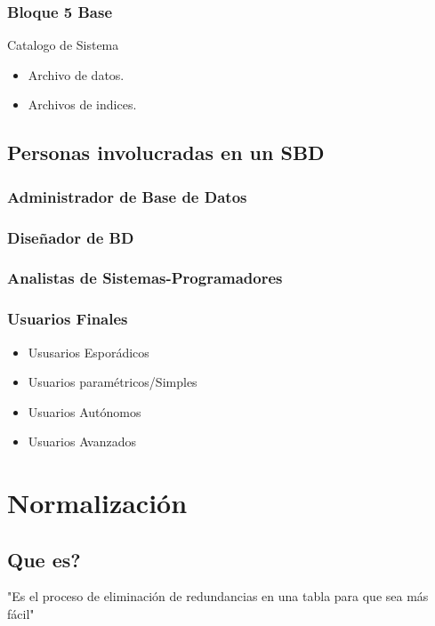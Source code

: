 \documentclass[12pt, fleqn]{report}                             %
\theoremstyle{break}                                            %
\begin{document}
		\subsubsection{Bloque 5 Base}

		Catalogo de Sistema
		\begin{itemize}
			\item Archivo de datos.
			\item Archivos de indices.
		\end{itemize}



	\subsection{Personas involucradas en un SBD}

		\subsubsection{Administrador de Base de Datos}
		\subsubsection{Diseñador de BD}
		\subsubsection{Analistas de Sistemas-Programadores}
		\subsubsection{Usuarios Finales}
		\begin{itemize}
			\item Ususarios Esporádicos
			\item Usuarios paramétricos/Simples
			\item Usuarios Autónomos
			\item Usuarios Avanzados
		\end{itemize}

    \section{Normalización}
    \subsection{Que es?}

    "Es el proceso de eliminación de redundancias en una tabla para que sea más fácil"
\end{document}
